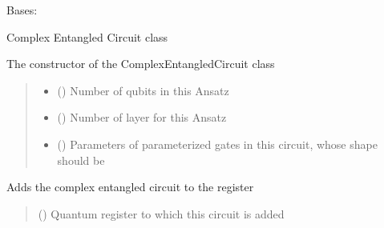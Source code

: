 \documentclass[letterpaper,10pt,english]{sphinxmanual}
\begin{document}
\begin{fulllineitems}
\label{\detokenize{qcompute_qapp.circuit:qcompute_qapp.circuit.ComplexEntangledCircuit}}
\pysigstartsignatures
{}
\pysigstopsignatures
\sphinxAtStartPar
Bases: {\hyperref[\detokenize{qcompute_qapp.circuit:qcompute_qapp.circuit.ParameterizedCircuit}]{}}

\sphinxAtStartPar
Complex Entangled Circuit class

\sphinxAtStartPar
The constructor of the ComplexEntangledCircuit class
\begin{quote}\begin{description}
\begin{itemize}
\item {} 
\sphinxAtStartPar
{} () \textendash{} Number of qubits in this Ansatz

\item {} 
\sphinxAtStartPar
{} () \textendash{} Number of layer for this Ansatz

\item {} 
\sphinxAtStartPar
{} () \textendash{} Parameters of parameterized gates in this circuit, whose shape
should be 

\end{itemize}

\end{description}\end{quote}

\begin{fulllineitems}
\label{\detokenize{qcompute_qapp.circuit:qcompute_qapp.circuit.ComplexEntangledCircuit.add_circuit}}
\pysigstartsignatures
{}
\pysigstopsignatures
\sphinxAtStartPar
Adds the complex entangled circuit to the register
\begin{quote}\begin{description}
\sphinxAtStartPar
{} () \textendash{} Quantum register to which this circuit is added


\end{description}
\end{quote}
\end{fulllineitems}
\end{fulllineitems}
\end{document}

